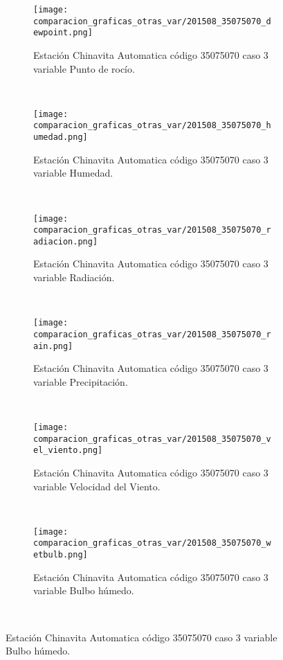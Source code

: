 \begin{figure}[H]
\centering
\begin{subfigure}[normla]{0.4\textwidth}
\caption{Estación Chinavita Automatica código 35075070 caso 3 variable Punto de rocío.}
\texttt{[image: comparacion\_graficas\_otras\_var/201508\_35075070\_dewpoint.png]}
\end{subfigure}
~
\begin{subfigure}[normla]{0.4\textwidth}
\caption{Estación Chinavita Automatica código 35075070 caso 3 variable Humedad.}
\texttt{[image: comparacion\_graficas\_otras\_var/201508\_35075070\_humedad.png]}
\end{subfigure}
~
\begin{subfigure}[normla]{0.4\textwidth}
\caption{Estación Chinavita Automatica código 35075070 caso 3 variable Radiación.}
\texttt{[image: comparacion\_graficas\_otras\_var/201508\_35075070\_radiacion.png]}
\end{subfigure}
~
\begin{subfigure}[normla]{0.4\textwidth}
\caption{Estación Chinavita Automatica código 35075070 caso 3 variable Precipitación.}
\texttt{[image: comparacion\_graficas\_otras\_var/201508\_35075070\_rain.png]}
\end{subfigure}
~
\begin{subfigure}[normla]{0.4\textwidth}
\caption{Estación Chinavita Automatica código 35075070 caso 3 variable Velocidad del Viento.}
\texttt{[image: comparacion\_graficas\_otras\_var/201508\_35075070\_vel\_viento.png]}
\end{subfigure}
~
\begin{subfigure}[normla]{0.4\textwidth}
\caption{Estación Chinavita Automatica código 35075070 caso 3 variable Bulbo húmedo.}
\texttt{[image: comparacion\_graficas\_otras\_var/201508\_35075070\_wetbulb.png]}
\end{subfigure}
~
\end{figure}
           
